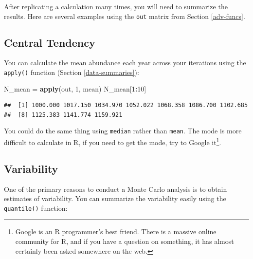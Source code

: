 \documentclass[]{book}
\newenvironment{Shaded}{\begin{snugshade}}{\end{snugshade}}
\newcommand{\CommentTok}[1]{\textcolor[rgb]{0.56,0.35,0.01}{\textit{#1}}}
\newcommand{\ControlFlowTok}[1]{\textcolor[rgb]{0.13,0.29,0.53}{\textbf{#1}}}
\newcommand{\DecValTok}[1]{\textcolor[rgb]{0.00,0.00,0.81}{#1}}
\newcommand{\FloatTok}[1]{\textcolor[rgb]{0.00,0.00,0.81}{#1}}
\newcommand{\KeywordTok}[1]{\textcolor[rgb]{0.13,0.29,0.53}{\textbf{#1}}}
\newcommand{\NormalTok}[1]{#1}
\newcommand{\OperatorTok}[1]{\textcolor[rgb]{0.81,0.36,0.00}{\textbf{#1}}}
\newcommand{\StringTok}[1]{\textcolor[rgb]{0.31,0.60,0.02}{#1}}
\let\rmarkdownfootnote\footnote%
\def\footnote{\protect\rmarkdownfootnote}
\begin{document}
After replicating a calculation many times, you will need to summarize the results. Here are several examples using the \texttt{out} matrix from Section \ref{adv-funcs}.

\hypertarget{central-tendency}{%
\subsection{Central Tendency}\label{central-tendency}}

You can calculate the mean abundance each year across your iterations using the \texttt{apply()} function (Section \ref{data-summaries}):

\begin{Shaded}
\begin{Highlighting}[]
\NormalTok{N_mean =}\StringTok{ }\KeywordTok{apply}\NormalTok{(out, }\DecValTok{1}\NormalTok{, mean)}
\NormalTok{N_mean[}\DecValTok{1}\OperatorTok{:}\DecValTok{10}\NormalTok{]}
\end{Highlighting}
\end{Shaded}

\begin{verbatim}
##  [1] 1000.000 1017.150 1034.970 1052.022 1068.358 1086.700 1102.685
##  [8] 1125.383 1141.774 1159.921
\end{verbatim}

You could do the same thing using \texttt{median} rather than \texttt{mean}. The mode is more difficult to calculate in R, if you need to get the mode, try to Google it\footnote{Google is an R programmer's best friend. There is a massive online community for R, and if you have a question on something, it has almost certainly been asked somewhere on the web.}.

\hypertarget{variability}{%
\subsection{Variability}\label{variability}}

One of the primary reasons to conduct a Monte Carlo analysis is to obtain estimates of variability. You can summarize the variability easily using the \texttt{quantile()} function:

\begin{Shaded}
\end{Shaded}
\end{document}
